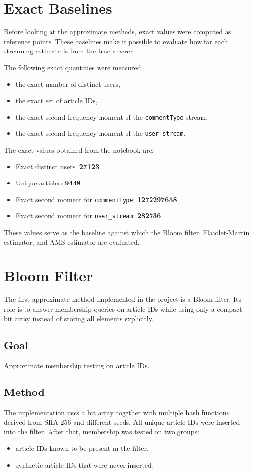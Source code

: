 \documentclass[11pt,a4paper]{article}
\begin{document}
\section{Exact Baselines}

Before looking at the approximate methods, exact values were computed as reference points. These baselines make it possible to evaluate how far each streaming estimate is from the true answer.

The following exact quantities were measured:
\begin{itemize}
    \item the exact number of distinct users,
    \item the exact set of article IDs,
    \item the exact second frequency moment of the \texttt{commentType} stream,
    \item the exact second frequency moment of the \texttt{user\_stream}.
\end{itemize}

The exact values obtained from the notebook are:
\begin{itemize}
    \item Exact distinct users: \textbf{27123}
    \item Unique articles: \textbf{9448}
    \item Exact second moment for \texttt{commentType}: \textbf{1272297658}
    \item Exact second moment for \texttt{user\_stream}: \textbf{282736}
\end{itemize}

These values serve as the baseline against which the Bloom filter, Flajolet-Martin estimator, and AMS estimator are evaluated.

\section{Bloom Filter}

The first approximate method implemented in the project is a Bloom filter. Its role is to answer membership queries on article IDs while using only a compact bit array instead of storing all elements explicitly.

\subsection*{Goal}
Approximate membership testing on article IDs.

\subsection*{Method}
The implementation uses a bit array together with multiple hash functions derived from SHA-256 and different seeds. All unique article IDs were inserted into the filter. After that, membership was tested on two groups:
\begin{itemize}
    \item article IDs known to be present in the filter,
    \item synthetic article IDs that were never inserted.
\end{itemize}
\end{document}
